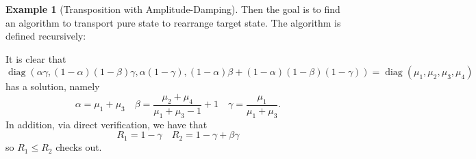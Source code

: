 \documentclass[11pt,reqno]{amsart}
\theoremstyle{definition}
\newtheorem{example}[theorem]{Example}
\DeclareMathOperator{\diag}{diag}
\begin{document}
\begin{example}[Transposition with Amplitude-Damping]
    Then the goal is to find an algorithm to transport pure state to rearrange target state.
    The algorithm is defined recursively:
    \begin{center}
    \end{center}
    It is clear that 
    $$\diag(\alpha\gamma, (1-\alpha)(1-\beta)\gamma, \alpha(1-\gamma), (1-\alpha)\beta+(1-\alpha)(1-\beta)(1-\gamma))=\diag (\mu_1, \mu_2, \mu_3, \mu_4)$$
    has a solution, namely
    $$\alpha=\mu_1+\mu_3\quad \beta=\frac{\mu_2+\mu_4}{\mu_1+\mu_3-1}+1\quad \gamma=\frac{\mu_1}{\mu_1+\mu_3}.$$
    In addition, via direct verification, we have that 
    $$R_1=1-\gamma\quad R_2=1-\gamma+\beta\gamma$$
    so $R_1\leq R_2$ checks out.
    

\end{example}
\end{document}

